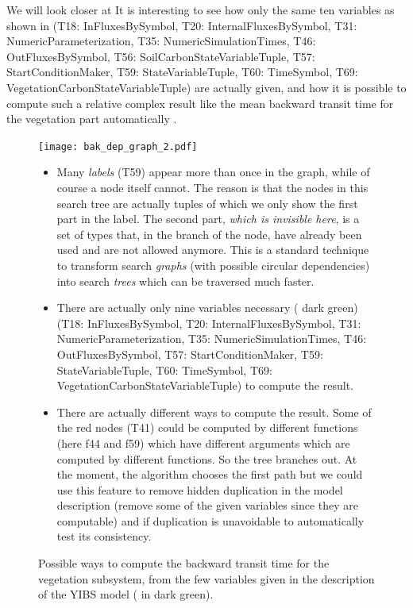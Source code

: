 We will look closer at  
   It is interesting to see how only the same ten variables 
  as shown in  
      (T18: InFluxesBySymbol, 
        	T20: InternalFluxesBySymbol, 
        	T31: NumericParameterization, 
        	T35: NumericSimulationTimes, 
        	T46: OutFluxesBySymbol, 
        	T56: SoilCarbonStateVariableTuple, 
        	T57: StartConditionMaker, 
        	T59: StateVariableTuple, 
        	T60: TimeSymbol, 
        	T69: VegetationCarbonStateVariableTuple)
  are actually given,
  and how it is possible to compute such a relative complex result
  like the mean backward transit time for the vegetation part automatically
  .
\begin{figure}[ht]
	\texttt{[image: bak\_dep\_graph\_2.pdf]}
    \caption{
      Possible ways to compute the backward transit time for the vegetation
      subsystem, from the few variables given in the description of the YIBS
      model ( in dark green).
    }
    \begin{itemize}
      \item
      Many \emph{labels} (\eg T59) appear more than once in the graph, while of
        course a node itself cannot.  The reason is that the nodes in this
        search tree are actually tuples of which we only show the first part in
        the label. The second part, \emph{which is invisible here}, is a set of
        types that, in the branch of the node, have already been used and are not
        allowed anymore.  This is a standard technique to transform search
        \emph{graphs} (with possible circular dependencies) into search
        \emph{trees} which can be traversed much faster.
      \item
        There are actually only nine variables necessary ( dark green)
        (T18: InFluxesBySymbol, 
        	T20: InternalFluxesBySymbol, 
        	T31: NumericParameterization, 
        	T35: NumericSimulationTimes, 
        	T46: OutFluxesBySymbol, 
        	T57: StartConditionMaker, 
        	T59: StateVariableTuple, 
        	T60: TimeSymbol, 
        	T69: VegetationCarbonStateVariableTuple) to compute the result.
      \item
        There are actually different ways to compute the result. Some of the red nodes (\eg T41) could be computed by different functions (here f44 and f59)  which have different arguments which are computed by different functions. So the tree branches out. 
        At the moment, the algorithm chooses the first path but we could use this feature to
        remove hidden duplication in the model description (remove some of the given variables since they are computable) and 
        if duplication is unavoidable to automatically test its consistency. 
    \end{itemize}
  \label{fig:dep_graph_2}
\end{figure}

